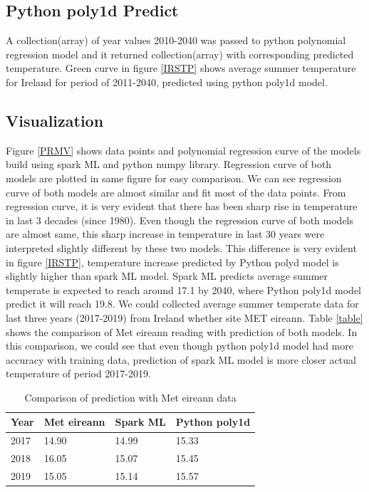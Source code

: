 \documentclass[journal,twoside,web]{ieeecolor}
\begin{document}
\subsection{Python poly1d Predict}
A collection(array) of year values 2010-2040 was passed to python polynomial regression model and it returned collection(array) with corresponding predicted temperature.  Green curve in figure \ref{IRSTP} shows average summer temperature for Ireland for period of 2011-2040, predicted using python poly1d model.

\subsection{Visualization}
Figure \ref{PRMV} shows data points and polynomial regression curve of the models build using spark ML and python numpy library.        Regression curve of both models are plotted in same figure for easy comparison. We can see regression curve of both models are almost similar and fit most of the data points.  From regression curve, it is very evident that there has been sharp rise in temperature in last 3 decades (since 1980).  Even though the regression curve of both models are almost same, this sharp increase in temperature in last 30 years were interpreted slightly different by these two models.  This difference is very evident in figure \ref{IRSTP}, temperature increase predicted by Python polyd model is slightly higher than spark ML model.  Spark ML predicts average summer temperate is expected to reach around 17.1 by 2040, where Python poly1d model predict it will reach 19.8.  We could collected average summer temperate data for last three years (2017-2019) from Ireland whether site MET eireann.  Table \ref{table} shows the comparison of Met eireann reading with prediction of both models.  In this comparison, we could see that even though python poly1d model had more accuracy with training data, prediction of spark ML model is more closer actual temperature of period 2017-2019.

\begin{table}
\centering
\caption{Comparison of prediction with Met eireann data}
\label{table}
\fontsize{9}{10.5}\selectfont
\begin{tabular}{|l|l|l|l|}
\hline
Year & Met eireann & Spark ML & Python poly1d\\
\hline
2017 & 14.90 & 14.99 & 15.33 \\
\hline
2018 & 16.05 & 15.07 & 15.45 \\
\hline
2019 & 15.05 & 15.14 & 15.57 \\
\hline
\end{tabular}
\label{tab1}
\end{table}
\end{document}
